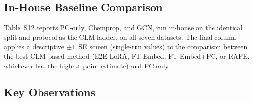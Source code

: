 \documentclass[9pt,a4paper]{article}
\begin{document}

\subsection*{In-House Baseline Comparison}

Table~S12 reports PC-only, Chemprop, and GCN, run in-house on the identical split
and protocol as the CLM ladder, on all seven datasets. The final column applies
a descriptive $\pm1$~SE screen (single-run values) to the comparison between the best
CLM-based method (E2E LoRA, FT Embed, FT Embed+PC, or RAFE, whichever has the
highest point estimate) and PC-only.


\begin{table}[htbp]
\centering
\caption{In-house PC-only/Chemprop/GCN baselines vs.\ the best CLM-based
method, all seven datasets. Primary metric: MCC (classification), Spearman
(regression). The last column is a descriptive $\pm1$~SE screen of single-run values; the paired comparisons of the controlled experiment are in Table~\ref{tab:supp_paired}.}
\label{tab:s11_inhouse}
\end{table}

\subsection*{Key Observations}
\end{document}
